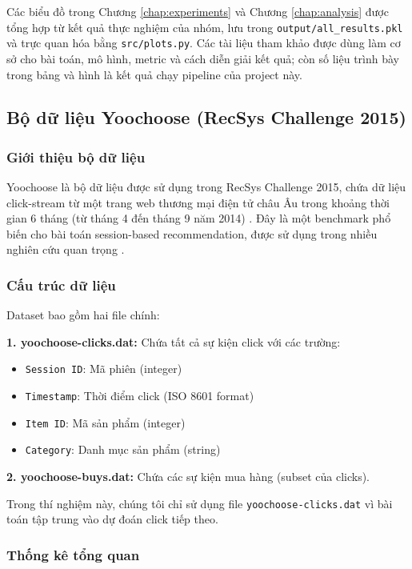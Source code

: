 \documentclass[12pt, a4paper]{article}
\begin{document}
Các biểu đồ trong Chương \ref{chap:experiments} và Chương \ref{chap:analysis} được tổng hợp từ kết quả thực nghiệm của nhóm, lưu trong \texttt{output/all\_results.pkl} và trực quan hóa bằng \texttt{src/plots.py}. Các tài liệu tham khảo được dùng làm cơ sở cho bài toán, mô hình, metric và cách diễn giải kết quả; còn số liệu trình bày trong bảng và hình là kết quả chạy pipeline của project này.

\subsection{Bộ dữ liệu Yoochoose (RecSys Challenge 2015)}

\subsubsection{Giới thiệu bộ dữ liệu}

Yoochoose là bộ dữ liệu được sử dụng trong RecSys Challenge 2015, chứa dữ liệu click-stream từ một trang web thương mại điện tử châu Âu trong khoảng thời gian 6 tháng (từ tháng 4 đến tháng 9 năm 2014) \cite{yoochoose2015}. Đây là một benchmark phổ biến cho bài toán session-based recommendation, được sử dụng trong nhiều nghiên cứu quan trọng \cite{hidasi2016, ludewig2018, jannach2017, li2017, wu2019}.

\subsubsection{Cấu trúc dữ liệu}

Dataset bao gồm hai file chính:

\textbf{1. yoochoose-clicks.dat:} Chứa tất cả sự kiện click với các trường:
\begin{itemize}
    \item \texttt{Session ID}: Mã phiên (integer)
    \item \texttt{Timestamp}: Thời điểm click (ISO 8601 format)
    \item \texttt{Item ID}: Mã sản phẩm (integer)
    \item \texttt{Category}: Danh mục sản phẩm (string)
\end{itemize}

\textbf{2. yoochoose-buys.dat:} Chứa các sự kiện mua hàng (subset của clicks).

Trong thí nghiệm này, chúng tôi chỉ sử dụng file \texttt{yoochoose-clicks.dat} vì bài toán tập trung vào dự đoán click tiếp theo.

\subsubsection{Thống kê tổng quan}
\end{document}
